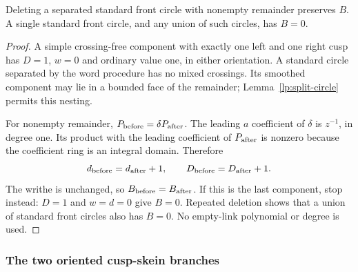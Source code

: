 \begin{lemma}\label{ng:circle}
Deleting a separated standard front circle with nonempty remainder
preserves $B$. A single standard front circle, and any union of such
circles, has $B=0$.
\end{lemma}
\begin{proof}
A simple crossing-free component with exactly one left and one right
cusp has $D=1$, $w=0$ and ordinary value one, in either orientation.
A standard circle separated by the word procedure has no mixed
crossings. Its smoothed component may lie in a bounded face of the
remainder; Lemma~\ref{lp:split-circle} permits this nesting.

For nonempty remainder, $P_{\rm before}=\delta P_{\rm after}$.
The leading $a$ coefficient of $\delta$ is $z^{-1}$, in degree one.
Its product with the leading coefficient of $P_{\rm after}$ is nonzero
because the coefficient ring is an integral domain. Therefore
\begin{equation}\label{ng:circle-counts}
 d_{\rm before}=d_{\rm after}+1,\qquad
 D_{\rm before}=D_{\rm after}+1.
\end{equation}
The writhe is unchanged, so $B_{\rm before}=B_{\rm after}$.
If this is the last component, stop instead: $D=1$ and $w=d=0$ give
$B=0$. Repeated deletion shows that a union of standard front circles
also has $B=0$. No empty-link polynomial or degree is used.
\end{proof}

\subsubsection{The two oriented cusp-skein branches}
\label{ng:cusp-skein-section}

